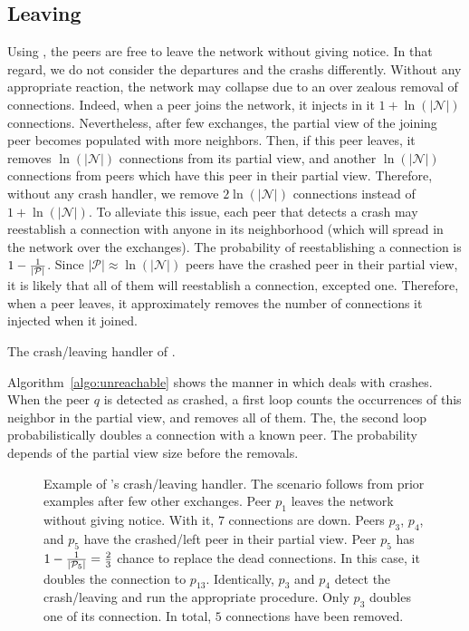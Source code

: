 \subsection{Leaving}
\label{subsec:leaving}

Using \SCAMPLON{}, the peers are free to leave the network without giving
notice. In that regard, we do not consider the departures and the crashs
differently.  Without any appropriate reaction, the network may collapse due to
an over zealous removal of connections. Indeed, when a peer joins the network,
it injects in it $1+\ln(|\mathcal{N}|)$ connections. Nevertheless, after few
exchanges, the partial view of the joining peer becomes populated with more
neighbors. Then, if this peer leaves, it removes $\ln(|\mathcal{N}|)$
connections from its partial view, and another $\ln(|\mathcal{N}|)$ connections
from peers which have this peer in their partial view. Therefore, without any
crash handler, we remove $2\ln(|\mathcal{N}|)$ connections instead of
$1+\ln(|\mathcal{N}|)$. To alleviate this issue, each peer that detects a crash
may reestablish a connection with anyone in its neighborhood (which will spread
in the network over the exchanges). The probability of reestablishing a
connection is $1-{1\over{|\mathcal{P}|}}$. Since
${|\mathcal{P}|}\approx \ln(|\mathcal{N}|)$ peers have the crashed peer in
their partial view, it is likely that all of them will reestablish a
connection, excepted one. Therefore, when a peer leaves, it approximately
removes the number of connections it injected when it joined.

\begin{algorithm}[h]
  
  \caption{\label{algo:unreachable}The crash/leaving handler of \SCAMPLON{}.}
\end{algorithm}

Algorithm~\ref{algo:unreachable} shows the manner in which \SCAMPLON{} deals
with crashes. When the peer $q$ is detected as crashed, a first loop counts the
occurrences of this neighbor in the partial view, and removes all of them. The,
the second loop probabilistically doubles a connection with a known peer. The
probability depends of the partial view size before the removals.

\begin{figure}
  
  \caption{\label{fig:crashexample}Example of \SCAMPLON{}'s crash/leaving
    handler. The scenario follows from prior examples after few other
    exchanges. Peer $p_1$ leaves the network without giving notice. With it,
    $7$ connections are down. Peers $p_3$, $p_4$, and $p_5$ have the
    crashed/left peer in their partial view. Peer $p_5$ has
    $1-{1\over{|\mathcal{P}_5|}}={2\over{3}}$ chance to replace the dead
    connections. In this case, it doubles the connection to
    $p_{13}$. Identically, $p_3$ and $p_4$ detect the crash/leaving and run the
    appropriate procedure. Only $p_3$ doubles one of its connection. In total,
    $5$ connections have been removed.}
\end{figure}


